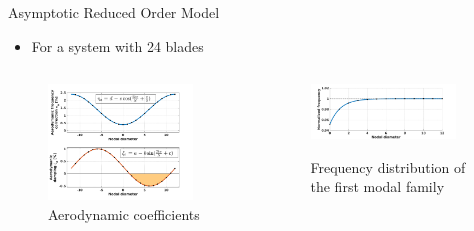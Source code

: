 \documentclass[dvipsnames, aspectratio = 169]{beamer}
\begin{document}
\begin{frame}{Asymptotic Reduced Order Model}
	\begin{itemize}
		\item For a system with 24 blades
	\end{itemize}
	\begin{columns}
		\begin{column}{0.5\textwidth}
			\begin{figure}[h!]
				\centering
				\includegraphics[width = 0.9\textwidth]{aerodynamic_coefficients.png}
				\caption{Aerodynamic coefficients}
				\label{fig:aerocoeff}
			\end{figure}
		\end{column}
		\begin{column}{0.5\textwidth}
			\begin{figure}[h!]
				\centering
				\includegraphics[width = 0.9\textwidth]{omega_distribution.png}
				\label{fig:omega_distribution}
				\caption{Frequency distribution of the first modal family}
			\end{figure}
		\end{column}
	\end{columns}
\end{frame}
\end{document}

